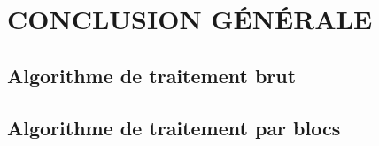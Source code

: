 \documentclass[12pt,twoside]{book}
\begin{document}
\chapter*{CONCLUSION GÉNÉRALE}

\backmatter


\backmatter
\begin{appendices}
\section{Algorithme de traitement brut}\label{Anne1}

\section{Algorithme de traitement par blocs}\label{Anne2}

\end{appendices}
\end{document}

